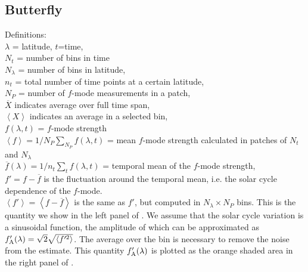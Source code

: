\documentclass{aa}
\begin{document}


\subsection{Butterfly}

Definitions:\\
$\lambda$ = latitude, $t$=time, \\
$N_t$ = number of bins in time \\
$N_\lambda$ = number of bins in latitude, \\
$n_t$ = total number of time points at a certain latitude, \\
$N_P$ = number of $f$-mode measurements in a patch, \\
$\overline{X}$ indicates average over full time span, \\
$\left< X \right>$ indicates an average in a selected bin, \\
$f(\lambda,t)$ = $f$-mode strength \\
$\left< f \right>=1/N_P \sum_{N_P} f (\lambda,t)$ = mean $f$-mode strength calculated in patches of $N_t$ and $N_\lambda$ \\
$\overline{f}(\lambda) = 1/n_t \sum_t f(\lambda,t)$ = temporal mean of the $f$-mode strength, \\
$f'=f-\overline{f}$ is the fluctuation around the temporal mean, i.e. the solar cycle dependence of the $f$-mode.\\
$\left< f' \right> = \left< f - \overline{f} \right> $ is the same as $f'$, but computed in $N_\lambda \times N_P$ bins. This is the quantity we show in the left panel of .
We assume that the solar cycle variation is a sinusoidal function, the amplitude of which can be approximated as 
$f'_{\rm A} (\lambda) = 
\sqrt{2} \sqrt{\left<{f'^2}\right>}$. 
The average over the bin is necessary to remove the noise from the estimate.
This quantity $f'_{\rm A} (\lambda)$ is plotted as the orange shaded area in the right panel of .
\end{document}
